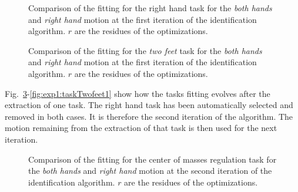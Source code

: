 \documentclass[letterpaper, 10pt, conference]{ieeeconf}      %
\begin{document}
\begin{figure}[t]
  \centering
  \caption{Comparison of the fitting for the right hand task for the
  \emph{both hands} and \emph{right hand} motion at the first
  iteration of the identification algorithm.  $r$ are
  the residues of the optimizations.}
  \label{fig:exp1:taskRhand0}
\end{figure}

\begin{figure}[t]
  \centering
  \caption{Comparison of the fitting for the \emph{two feet} task for the
  \emph{both hands} and \emph{right hand} motion at the first
  iteration of the identification algorithm.  $r$ are the
  residues of the optimizations.}
  \label{fig:exp1:taskTwofeet0}
\end{figure}

Fig.~\ref{fig:exp1:taskCom1}-\ref{fig:exp1:taskTwofeet1} show how the
tasks fitting evolves after the extraction of one task.
The right hand task has been automatically selected and removed in both cases.
It is therefore the second iteration of the algorithm. 
The motion remaining from the extraction of that task is then used for the next iteration.

\begin{figure}[t]
  \centering
\caption{Comparison of the fitting for the center of masses regulation task for the \emph{both hands} and \emph{right hand} motion at the second iteration of the identification algorithm.
$r$ are the residues of the optimizations.}
\label{fig:exp1:taskCom1}
\end{figure}
\end{document}
